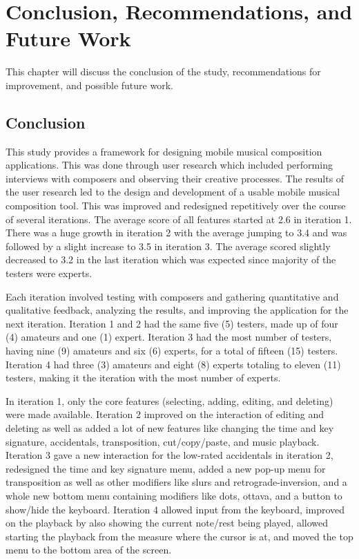 
\chapter{Conclusion, Recommendations, and Future Work}

	This chapter will discuss the conclusion of the study, recommendations for improvement, and possible future work.

	\section{Conclusion}

		This study provides a framework for designing mobile musical composition applications. This was done through user research which included performing interviews with composers and observing their creative processes. The results of the user research led to the design and development of a usable mobile musical composition tool. This was improved and redesigned repetitively over the course of several iterations. The average score of all features started at 2.6 in iteration 1. There was a huge growth in iteration 2 with the average jumping to 3.4 and was followed by a slight increase to 3.5 in iteration 3. The average scored slightly decreased to 3.2 in the last iteration which was expected since majority of the testers were experts. 

		Each iteration involved testing with composers and gathering quantitative and qualitative feedback, analyzing the results, and improving the application for the next iteration. Iteration 1 and 2 had the same five (5) testers, made up of four (4) amateurs and one (1) expert. Iteration 3 had the most number of testers, having nine (9) amateurs and six (6) experts, for a total of fifteen (15) testers. Iteration 4 had three (3) amateurs and eight (8) experts totaling to eleven (11) testers, making it the iteration with the most number of experts. 

		In iteration 1, only the core features (selecting, adding, editing, and deleting) were made available. Iteration 2 improved on the interaction of editing and deleting as well as added a lot of new features like changing the time and key signature, accidentals, transposition, cut/copy/paste, and music playback. Iteration 3 gave a new interaction for the low-rated accidentals in iteration 2, redesigned the time and key signature menu, added a new pop-up menu for transposition as well as other modifiers like slurs and retrograde-inversion, and a whole new bottom menu containing modifiers like dots, ottava, and a button to show/hide the keyboard. Iteration 4 allowed input from the keyboard, improved on the playback by also showing the current note/rest being played, allowed starting the playback from the measure where the cursor is at, and moved the top menu to the bottom area of the screen.

